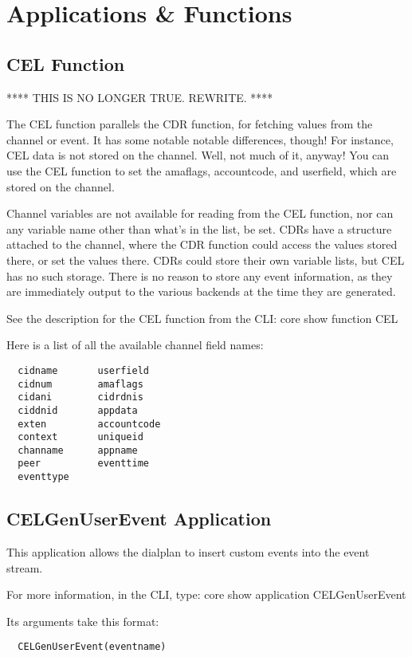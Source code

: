 \section{Applications \& Functions}

\subsection{CEL Function}

**** THIS IS NO LONGER TRUE.  REWRITE. ****

The CEL function parallels the CDR function, for fetching values from the
channel or event.  It has some notable notable differences, though! For
instance, CEL data is not stored on the channel. Well, not much of it, anyway!
You can use the CEL function to set the amaflags, accountcode, and userfield,
which are stored on the channel.

Channel variables are not available for reading from the CEL function, nor can
any variable name other than what's in the list, be set. CDRs have a structure
attached to the channel, where the CDR function could access the values stored
there, or set the values there. CDRs could store their own variable lists, but
CEL has no such storage. There is no reason to store any event information, as
they are immediately output to the various backends at the time they are
generated.

See the description for the CEL function from the CLI: core show function CEL

Here is a list of all the available channel field names:
\begin{verbatim}
  cidname       userfield
  cidnum        amaflags
  cidani        cidrdnis
  ciddnid       appdata
  exten         accountcode
  context       uniqueid
  channame      appname
  peer          eventtime
  eventtype
\end{verbatim}

\subsection{CELGenUserEvent Application}

This application allows the dialplan to insert custom events into the event
stream.

For more information, in the CLI, type: core show application CELGenUserEvent

Its arguments take this format:

\begin{verbatim}
  CELGenUserEvent(eventname)
\end{verbatim}


